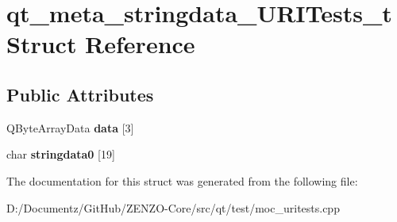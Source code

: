 \hypertarget{structqt__meta__stringdata___u_r_i_tests__t}{}\section{qt\+\_\+meta\+\_\+stringdata\+\_\+\+U\+R\+I\+Tests\+\_\+t Struct Reference}
\label{structqt__meta__stringdata___u_r_i_tests__t}
\subsection*{Public Attributes}
\begin{DoxyCompactItemize}
\item 
\mbox{\label{structqt__meta__stringdata___u_r_i_tests__t_a42434186156a7d33deb69d61536320b4}} 
Q\+Byte\+Array\+Data {\bfseries data} \mbox{[}3\mbox{]}
\item 
\mbox{\label{structqt__meta__stringdata___u_r_i_tests__t_a34d727d1d3a0d0b85e9f2d25a66f9275}} 
char {\bfseries stringdata0} \mbox{[}19\mbox{]}
\end{DoxyCompactItemize}


The documentation for this struct was generated from the following file\+:\begin{DoxyCompactItemize}
\item 
D\+:/\+Documentz/\+Git\+Hub/\+Z\+E\+N\+Z\+O-\/\+Core/src/qt/test/moc\+\_\+uritests.\+cpp\end{DoxyCompactItemize}
